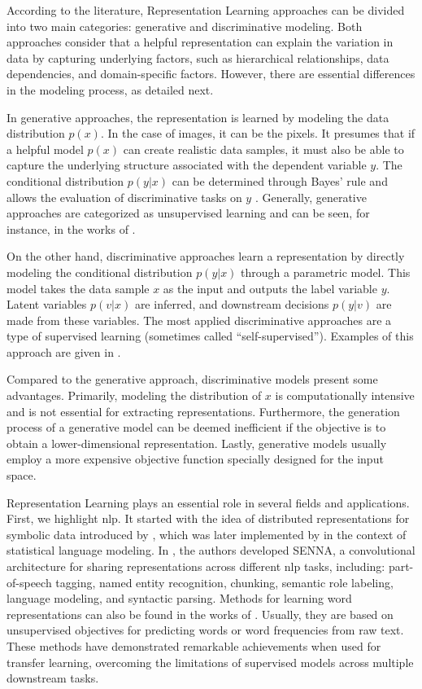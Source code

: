 According to the literature, Representation Learning approaches can be divided into two main categories: generative and discriminative modeling. Both approaches consider that a helpful representation can explain the variation in data by capturing underlying factors, such as hierarchical relationships, data dependencies, and domain-specific factors. However, there are essential differences in the modeling process, as detailed next.
 
In generative approaches, the representation is learned by modeling the data distribution $p(x)$. In the case of images, it can be the pixels. It presumes that if a helpful model $p(x)$ can create realistic data samples, it must also be able to capture the underlying structure associated with the dependent variable $y$. The conditional distribution $p(y|x)$ can be determined through Bayes' rule and allows the evaluation of discriminative tasks on $y$ \citep{le2020contrastive}. Generally, generative approaches are categorized as unsupervised learning and can be seen, for instance, in the works of \cite{NIPS2014_5ca3e9b1, kingma2013auto}.
 
On the other hand, discriminative approaches learn a representation by directly modeling the conditional distribution $p(y|x)$ through a parametric model. This model takes the data sample $x$ as the input and outputs the label variable $y$. Latent variables $p(v|x)$ are inferred, and downstream decisions $p(y|v)$ are made from these variables. The most applied discriminative approaches are a type of supervised learning (sometimes called ``self-supervised''). Examples of this approach are given in \citep{dosovitskiy2014discriminative, Zhang_2017_CVPR}.
 
Compared to the generative approach, discriminative models present some advantages. Primarily, modeling the distribution of $x$ is computationally intensive and is not essential for extracting representations. Furthermore, the generation process of a generative model can be deemed inefficient if the objective is to obtain a lower-dimensional representation. Lastly, generative models usually employ a more expensive objective function specially designed for the input space.
 
Representation Learning plays an essential role in several fields and applications. First, we highlight \acl{nlp}. It started with the idea of distributed representations for symbolic data introduced by \cite{hinton1986learning}, which was later implemented by \cite{bengio2000neural} in the context of statistical language modeling. In \citep{collobert2011natural}, the authors developed SENNA, a convolutional architecture for sharing representations across different \acs{nlp} tasks, including: part-of-speech tagging, named entity recognition, chunking, semantic role labeling, language modeling, and syntactic parsing. Methods for learning word representations can also be found in the works of \cite{mnih2013learning, pennington2014glove}. Usually, they are based on unsupervised objectives for predicting words or word frequencies from raw text. These methods have demonstrated remarkable achievements when used for transfer learning, overcoming the limitations of supervised models across multiple downstream tasks.
 
